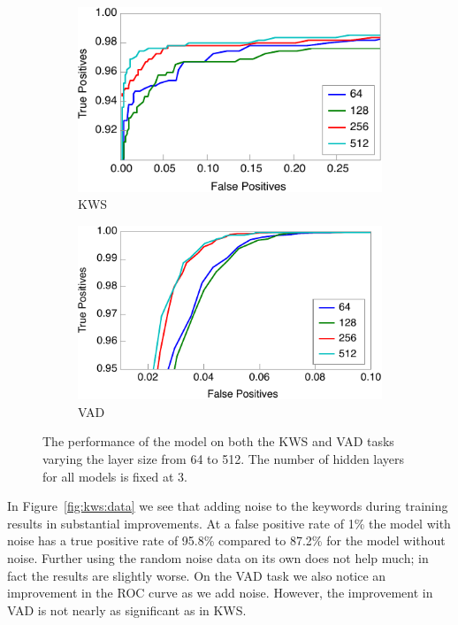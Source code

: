 \begin{figure}
\centering
\begin{subfigure}{0.47\textwidth}
    \includegraphics[width=\textwidth]{kws/figures/sizes.pdf}
    \caption{KWS}
\end{subfigure}
\hfill
\begin{subfigure}{0.47\textwidth}
    \includegraphics[width=\textwidth]{kws/figures/sizes_vad.pdf}
    \caption{VAD}
\end{subfigure}
\caption{The performance of the model on both the KWS and VAD tasks varying the
         layer size from 64 to 512. The number of hidden layers for all models is
         fixed at 3.}
\label{fig:kws:sizes} 
\end{figure}

In Figure~\ref{fig:kws:data} we see that adding noise to the keywords during
training results in substantial improvements. At a false positive rate of 1\%
the model with noise has a true positive rate of 95.8\% compared to 87.2\% for
the model without noise. Further using the random noise data on its own does
not help much; in fact the results are slightly worse. On the VAD task we also
notice an improvement in the ROC curve as we add noise. However, the
improvement in VAD is not nearly as significant as in KWS.

